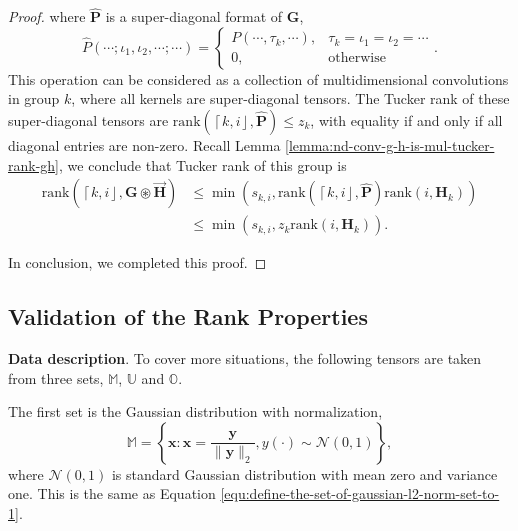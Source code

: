 \documentclass[twoside,11pt]{article}
\def\oconv{\circledast}
\def\rank{\text{rank}}
\def\tvar#1{\mathbf{#1}} %
\def\tvarhat#1{\widehat{\mathbf{#1}}} %
\def\vsymb#1{\vec{\mathbf{#1}}}
\def\lcerfl#1{\left\lceil{#1}\right\rfloor}
\begin{document}
\begin{proof}
    where \(\tvarhat{P}\) is a super-diagonal format of \(\tvar{G}\),
    \begin{equation*}
      \hat{P}(\cdots; \iota_1, \iota_2, \cdots; \cdots)
      = \left\{\begin{array}{ll}
        P(\cdots, \tau_k, \cdots), & \tau_k = \iota_1 = \iota_2 = \cdots \\
        0,                         & \text{otherwise}
      \end{array}\right. .
    \end{equation*}
    This operation can be considered as a collection of multidimensional convolutions in group \(k\), where all kernels are super-diagonal tensors.
    The Tucker rank of these super-diagonal tensors are \(\rank\left(\lcerfl{k,i}, \tvarhat{P}\right) \le z_k\), with equality if and only if all diagonal entries are non-zero.
    Recall Lemma \ref{lemma:nd-conv-g-h-is-mul-tucker-rank-gh}, we conclude that Tucker rank of this group is
    \begin{equation*}
      \begin{aligned}
        \rank\left(\lcerfl{k,i}, \tvar{G} \oconv \vsymb{H} \right)
         & \le \min(s_{k,i}, \rank\left(\lcerfl{k,i}, \tvarhat{P}\right) \rank(i, \tvar{H}_k)) \\
         & \le \min(s_{k,i}, z_k \rank(i, \tvar{H}_k)).
      \end{aligned}
    \end{equation*}
  
  In conclusion, we completed this proof.
\end{proof}

\subsection{Validation of the Rank Properties}
\label{subsec:validate-rank-after-outer-convolution}

\textbf{Data description}.
  To cover more situations, the following tensors are taken from three sets, \(\mathbb{M}\), \(\mathbb{U}\) and \(\mathbb{O}\). 

The first set is the Gaussian distribution with normalization,
  \begin{equation*}
    \mathbb{M} = \left\{
    \tvar{x} : \tvar{x} = \dfrac{\tvar{y}}{\|\tvar{y}\|_{2}}, y(\cdot) \sim \mathcal{N}(0, 1)
    \right\},
  \end{equation*}
  where \(\mathcal{N}(0,1)\) is standard Gaussian distribution with mean zero and variance one. This is the same as Equation \ref{equ:define-the-set-of-gaussian-l2-norm-set-to-1}.
\end{document}
